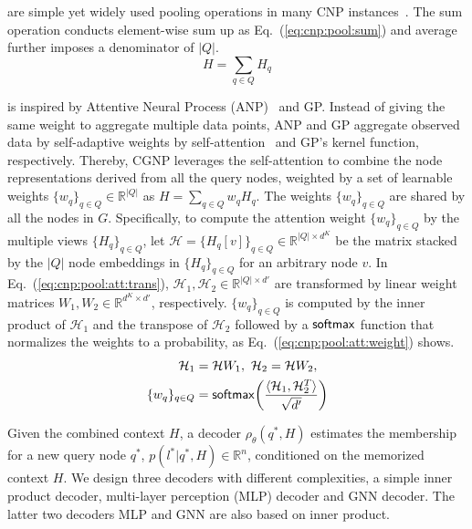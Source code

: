  are simple yet widely used pooling operations in many CNP instances~\cite{GQN, CNP}. The sum operation conducts element-wise sum up as Eq.~(\ref{eq:cnp:pool:sum}) and average further imposes a denominator of $|Q|$.
%
\begin{equation}
	\label{eq:cnp:pool:sum}
	H = \sum_{q \in Q} H_q
\end{equation}

 is inspired by Attentive Neural Process (ANP)~\cite{DBLP:conf/iclr/KimMSGERVT19} and GP. 
Instead of giving the same weight to aggregate multiple data points, ANP and GP aggregate observed data by self-adaptive weights by self-attention~\cite{attention} and GP's kernel function, respectively.  
Thereby, CGNP leverages the self-attention to combine the node representations derived from all the query nodes, weighted by a set of learnable weights $\{w_q \}_{q \in Q} \in \mathbb{R}^{|Q|}$ as $H = \sum_{q \in Q} w_q H_q$. The weights $\{w_q \}_{q \in Q}$ are shared by all the nodes in $G$. 
%
\comment{
\begin{align}
	\label{eq:cnp:pool:attention}
	
\end{align}
}
%
Specifically, to compute the attention weight $\{w_q \}_{q \in Q}$ by the multiple views $\{ H_q\}_{q \in Q}$, let $\mathcal{H} = \{H_q[v]\}_{q \in Q} \in \mathbb{R}^{|Q| \times d^K}$ be the matrix stacked by the $|Q|$ node embeddings in $\{ H_q\}_{q \in Q}$ for an arbitrary node $v$. 
In Eq.~(\ref{eq:cnp:pool:att:trans}), 
$\mathcal{H}_{1} , \mathcal{H}_{2} \in \mathbb{R}^{|Q| \times d'}$ are transformed by linear weight matrices $W_{1} , W_{2} \in \mathbb{R}^{d^{K} \times d'}$, respectively. 
%
$\{w_q \}_{q \in Q}$ is computed by the inner product of $\mathcal{H}_{1}$ and the transpose of $\mathcal{H}_{2}$ followed by a $\mathsf{softmax}$ function that normalizes the weights to a probability, as Eq.~(\ref{eq:cnp:pool:att:weight}) shows.
\begin{align}
	\label{eq:cnp:pool:att:trans}
	\mathcal{H}_{1} &= \mathcal{H} W_{1},~ \mathcal{H}_{2} = \mathcal{H} W_{2},~\\
	\label{eq:cnp:pool:att:weight}
	\{w_q \}_{q \in Q} &= \mathsf{softmax} \biggl(\frac{ \langle\mathcal{H}_{1},  \mathcal{H}_{2}^T \rangle}{\sqrt{d'}} \biggr) 
\end{align}

 Given the combined context $H$, a decoder $\rho_{\theta}(q^*, H)$ estimates the membership  for a new query node $q^*$, $p(l^* | q^*, H) \in \mathbb{R}^{n}$, conditioned on the memorized context $H$. 
We design three decoders with different complexities, a simple inner product decoder, multi-layer perception (MLP) decoder and GNN decoder. The latter two decoders MLP and GNN are also based on inner product. 

